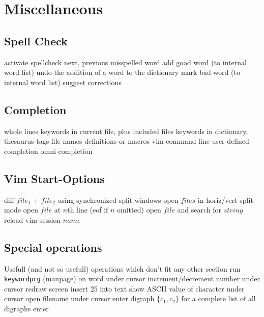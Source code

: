 \section{Miscellaneous}	{}

\subsection{Spell Check}	{}
	{activate spellcheck}
\cmdS{]s\ [s }	{next, previous misspelled word}
	{add good word (to internal word list)}
	{undo the addition of a word to the dictionary}
	{mark bad word (to internal word list)}
	{suggest corrections}

\subsection{Completion}	{}
	{whole lines}
	{keywords in current file, plus included files}
	{keywords in dictionary, thesaurus}
\cmdS{\ctrl{}X\ctrl{}]}	{tags}
	{file names}
	{definitions or macros}
	{vim command line}
	{user defined completion}
	{omni completion}

\subsection{Vim Start-Options}	{}
	{diff $file_1$ + $file_2$ using synchronized split windows}
	{open $files$ in horiz/vert split mode}
	{open $file$ at $n$th line (eof if $n$ omitted)}
	{open $file$ and search for $string$ }
	{reload vim-session $name$}

\subsection{Special operations}	{Usefull (and not so usefull) operations which don't fit any other section}
	{run {\tt keywordprg} (manpage) on word under cursor}
	{increment/decrement number under cursor}
	{redraw screen}
	{insert 25 into text}
	{show A{\smallrm SCII} value of character under cursor}
	{open filename under cursor}
	{enter digraph $\{c_1,c_2\}$}
	{for a complete list of all digraphs enter}

